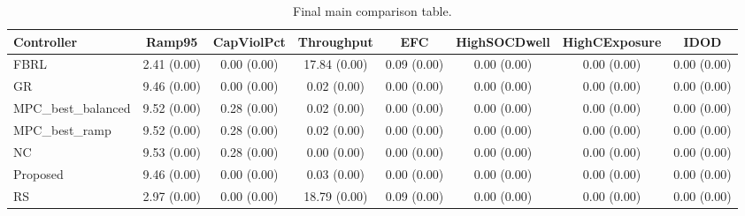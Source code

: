 \begin{table}[t]
\centering
\caption{Final main comparison table.}
\label{tab:results_final_auto}
\begin{tabular}{lccccccc}
\toprule
Controller & Ramp95 & CapViolPct & Throughput & EFC & HighSOCDwell & HighCExposure & IDOD \\
\midrule
FBRL & 2.41 (0.00) & 0.00 (0.00) & 17.84 (0.00) & 0.09 (0.00) & 0.00 (0.00) & 0.00 (0.00) & 0.00 (0.00) \\
GR & 9.46 (0.00) & 0.00 (0.00) & 0.02 (0.00) & 0.00 (0.00) & 0.00 (0.00) & 0.00 (0.00) & 0.00 (0.00) \\
MPC\_best\_balanced & 9.52 (0.00) & 0.28 (0.00) & 0.02 (0.00) & 0.00 (0.00) & 0.00 (0.00) & 0.00 (0.00) & 0.00 (0.00) \\
MPC\_best\_ramp & 9.52 (0.00) & 0.28 (0.00) & 0.02 (0.00) & 0.00 (0.00) & 0.00 (0.00) & 0.00 (0.00) & 0.00 (0.00) \\
NC & 9.53 (0.00) & 0.28 (0.00) & 0.00 (0.00) & 0.00 (0.00) & 0.00 (0.00) & 0.00 (0.00) & 0.00 (0.00) \\
Proposed & 9.46 (0.00) & 0.00 (0.00) & 0.03 (0.00) & 0.00 (0.00) & 0.00 (0.00) & 0.00 (0.00) & 0.00 (0.00) \\
RS & 2.97 (0.00) & 0.00 (0.00) & 18.79 (0.00) & 0.09 (0.00) & 0.00 (0.00) & 0.00 (0.00) & 0.00 (0.00) \\
\bottomrule
\end{tabular}
\end{table}